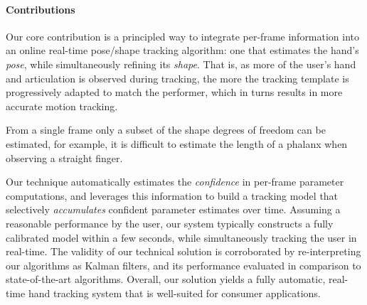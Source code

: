 \paragraph{Contributions}
Our core contribution is a principled way to integrate per-frame information into an online real-time pose/shape tracking algorithm: one that estimates the hand's \emph{pose}, while simultaneously refining its \emph{shape}. That is, as more of the user's hand and articulation is observed during tracking, the more the tracking template is progressively adapted to match the performer, which in turns results in more accurate motion tracking. 
\begin{edit}
From a single frame only a subset of the shape degrees of freedom can be estimated, for example, it is difficult to estimate the length of a phalanx when observing a straight finger.
\end{edit}
Our technique automatically estimates the \emph{confidence} in per-frame parameter computations, and leverages this information to build a tracking model that selectively \emph{accumulates} confident parameter estimates over time. Assuming a reasonable performance by the user, our system typically constructs a fully calibrated model within a few seconds, while simultaneously tracking the user in real-time.
The validity of our technical solution is corroborated by re-interpreting our algorithms as Kalman filters, 
and its performance evaluated in comparison to state-of-the-art algorithms. Overall, our solution yields a fully automatic, real-time hand tracking system that is well-suited for consumer applications.

